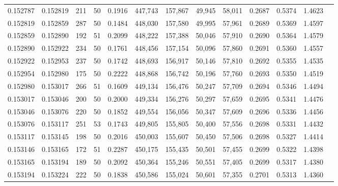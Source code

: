 \begin{tabular}{rrrrrrrrrrrrr}
0.152787 & 0.152819 &   211 &  50 &                                     0.1916 & 447,743 & 157,867 &  49,945 &  58,011 & 0.2687 & 0.5374 & 1.4623 \\
0.152819 & 0.152859 &   287 &  50 &                                     0.1484 & 448,030 & 157,580 &  49,995 &  57,961 & 0.2689 & 0.5369 & 1.4597 \\
0.152859 & 0.152890 &   192 &  51 &                                     0.2099 & 448,222 & 157,388 &  50,046 &  57,910 & 0.2690 & 0.5364 & 1.4579 \\
0.152890 & 0.152922 &   234 &  50 &                                     0.1761 & 448,456 & 157,154 &  50,096 &  57,860 & 0.2691 & 0.5360 & 1.4557 \\
0.152922 & 0.152953 &   237 &  50 &                                     0.1742 & 448,693 & 156,917 &  50,146 &  57,810 & 0.2692 & 0.5355 & 1.4535 \\
0.152954 & 0.152980 &   175 &  50 &                                     0.2222 & 448,868 & 156,742 &  50,196 &  57,760 & 0.2693 & 0.5350 & 1.4519 \\
0.152980 & 0.153017 &   266 &  51 &                                     0.1609 & 449,134 & 156,476 &  50,247 &  57,709 & 0.2694 & 0.5346 & 1.4494 \\
0.153017 & 0.153046 &   200 &  50 &                                     0.2000 & 449,334 & 156,276 &  50,297 &  57,659 & 0.2695 & 0.5341 & 1.4476 \\
0.153046 & 0.153076 &   220 &  50 &                                     0.1852 & 449,554 & 156,056 &  50,347 &  57,609 & 0.2696 & 0.5336 & 1.4456 \\
0.153076 & 0.153117 &   251 &  53 &                                     0.1743 & 449,805 & 155,805 &  50,400 &  57,556 & 0.2698 & 0.5331 & 1.4432 \\
0.153117 & 0.153145 &   198 &  50 &                                     0.2016 & 450,003 & 155,607 &  50,450 &  57,506 & 0.2698 & 0.5327 & 1.4414 \\
0.153146 & 0.153165 &   172 &  51 &                                     0.2287 & 450,175 & 155,435 &  50,501 &  57,455 & 0.2699 & 0.5322 & 1.4398 \\
0.153165 & 0.153194 &   189 &  50 &                                     0.2092 & 450,364 & 155,246 &  50,551 &  57,405 & 0.2699 & 0.5317 & 1.4380 \\
0.153194 & 0.153224 &   222 &  50 &                                     0.1838 & 450,586 & 155,024 &  50,601 &  57,355 & 0.2701 & 0.5313 & 1.4360 \\

\end{tabular}
